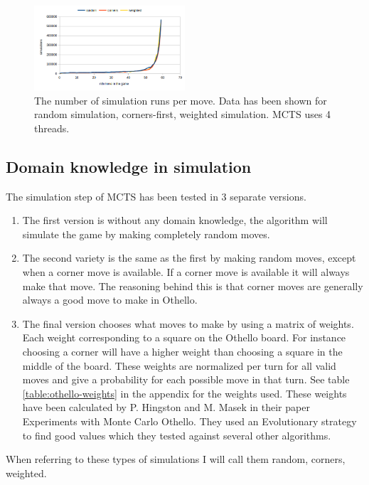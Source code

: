 \documentclass[11pt,a4paper]{article}
\begin{document}
\begin{figure}
	\centering
	\includegraphics[width=0.5\textwidth]{images/mcts-simulations-domainknowledge}
	\caption{The number of simulation runs per move. Data has been shown for random simulation, corners-first, weighted simulation. MCTS uses 4 threads.}
	\label{fig:mcts-domainknowledge}
\end{figure}

\subsection{Domain knowledge in simulation}
The simulation step of MCTS has been tested in 3 separate versions.
\begin{enumerate}
\item The first version is without any domain knowledge, the algorithm will simulate the game by making completely random moves.

\item The second variety is the same as the first by making random moves, except when a corner move is available. If a corner move is available it will always make that move. The reasoning behind this is that corner moves are generally always a good move to make in Othello.

\item The final version chooses what moves to make by using a matrix of weights. Each weight corresponding to a square on the Othello board. For instance choosing a corner will have a higher weight than choosing a square in the middle of the board. These weights are normalized per turn for all valid moves and give a probability for each possible move in that turn. See table \ref{table:othello-weights} in the appendix for the weights used. These weights have been calculated by P. Hingston and M. Masek in their paper Experiments with Monte Carlo Othello\cite{hingston2007experiments}. They used an Evolutionary strategy to find good values which they tested against several other algorithms.

\end{enumerate}
When referring to these types of simulations I will call them random, corners, weighted.
\end{document}

